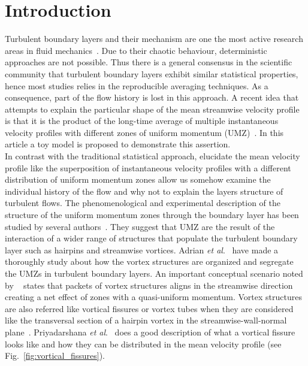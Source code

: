\documentclass[aps,reprint,amsmath,amssymb,pra,floatfix]{revtex4-1}%
\begin{document}
\section{\label{sec:intro} Introduction}
Turbulent boundary layers and their mechanism are one the most active research areas in fluid mechanics~\citep{kline1967,head1981,heist2000}. Due to their chaotic behaviour, deterministic approaches are not possible. Thus there is a general consensus in the scientific community that turbulent boundary layers exhibit similar statistical properties, hence most studies relies in the reproducible averaging techniques.  As a consequence, part of the flow history is lost in this approach. A recent idea that attempts to explain the particular shape of the mean streamwise velocity profile is that it is the product of the long-time average of multiple instantaneous velocity profiles with different zones of uniform momentum (UMZ)~\citep{mca1995,umz2015}. In this article a toy model is proposed to demonstrate this assertion.\\
In contrast with the traditional statistical approach, elucidate the mean velocity profile like the superposition of instantaneous velocity profiles with a different distribution of uniform momentum zones allow us somehow examine the individual history of the flow and why not to explain the layers structure of turbulent flows.
The phenomenological and experimental description of the structure of the uniform momentum zones through the boundary layer has been studied by several authors~\citep{mca1995,amt2000,umz2015}. They suggest that UMZ are the result of the interaction of a wider range of structures that populate the turbulent boundary layer\cite{amt2000} such as hairpins and streamwise vortices. Adrian \textit{et al}.~\cite{amt2000} have made a thoroughly  study about how the vortex structures are organized and segregate the UMZs in turbulent boundary layers. An important conceptual scenario noted by ~\cite{amt2000} states that packets of vortex structures aligns in the streamwise direction creating a net effect of zones with a quasi-uniform momentum. Vortex structures are also referred like vortical fissures or vortex tubes when they are considered like the transversal section of a hairpin vortex in the streamwise-wall-normal plane~\cite{amt2000}.  
Priyadarshana \textit{et al}.~\citep{priya2007} does a good description of what a vortical fissure looks like and how they can be distributed in the mean velocity profile (see Fig.~\ref{fig:vortical_fissures}). 
\end{document}
